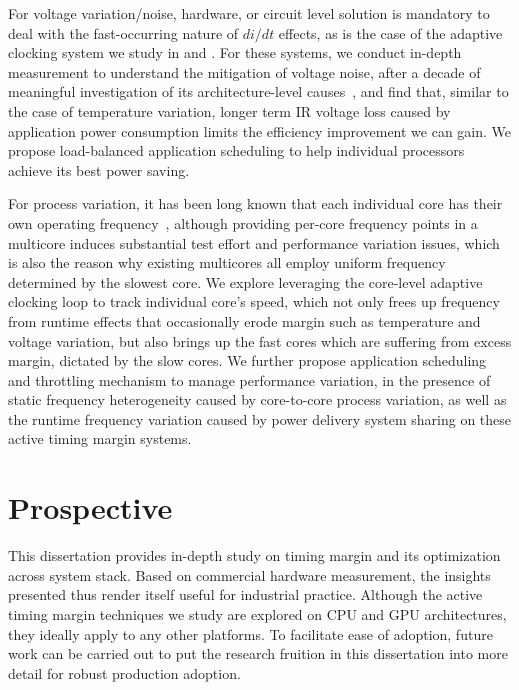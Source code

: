 For voltage variation/noise, hardware, or circuit level solution is mandatory to deal with the fast-occurring nature of $di/dt$ effects, as is the case of the adaptive clocking system we study in  and . For these systems, we conduct in-depth measurement to understand the mitigation of voltage noise, after a decade of meaningful investigation of its architecture-level causes~\cite{grochowski2002microarchitectural,powell2003pipeline,gupta2007understanding,gupta2008decor,gupta2009event,reddi2009voltage,reddi2010voltage,miller2012vrsync,zhang2014architecture}, and find that, similar to the case of temperature variation, longer term IR voltage loss caused by application power consumption limits the efficiency improvement we can gain. We propose load-balanced application scheduling to help individual processors achieve its best power saving.

For process variation, it has been long known that each individual core has their own operating frequency~\cite{liang2007process,sarangi2008varius,teodorescu2008variation,rangan2009thread,dighe2010within,rangan2011achieving}, although providing per-core frequency points in a multicore induces substantial test effort and performance variation issues, which is also the reason why existing multicores all employ uniform frequency determined by the slowest core. We explore leveraging the core-level adaptive clocking loop to track individual core's speed, which not only frees up frequency from runtime effects that occasionally erode margin such as temperature and voltage variation, but also brings up the fast cores which are suffering from excess margin, dictated by the slow cores. We further propose application scheduling and throttling mechanism to manage performance variation, in the presence of static frequency heterogeneity caused by core-to-core process variation, as well as the runtime frequency variation caused by power delivery system sharing on these active timing margin systems.

\section{Prospective}
\label{sec:conc:pros}

This dissertation provides in-depth study on timing margin and its optimization across system stack. Based on commercial hardware measurement, the insights presented thus render itself useful for industrial practice. Although the active timing margin techniques we study are explored on CPU and GPU architectures, they ideally apply to any other platforms. To facilitate ease of adoption, future work can be carried out to put the research fruition in this dissertation into more detail for robust production adoption.

